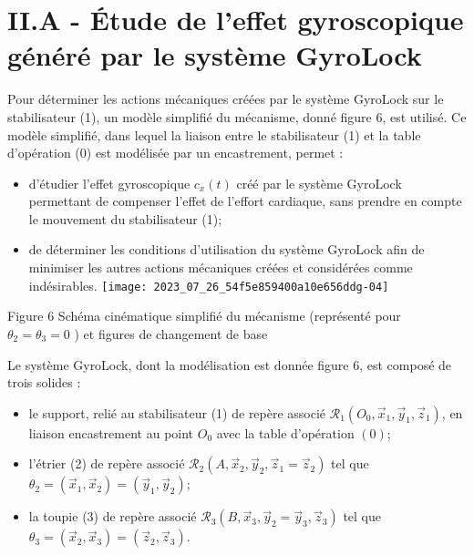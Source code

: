 \section{II.A - Étude de l'effet gyroscopique généré par le système GyroLock}
Pour déterminer les actions mécaniques créées par le système GyroLock sur le stabilisateur (1), un modèle simplifié du mécanisme, donné figure 6, est utilisé. Ce modèle simplifié, dans lequel la liaison entre le stabilisateur (1) et la table d'opération (0) est modélisée par un encastrement, permet :

\begin{itemize}
  \item d'étudier l'effet gyroscopique $c_{x}(t)$ créé par le système GyroLock permettant de compenser l'effet de l'effort cardiaque, sans prendre en compte le mouvement du stabilisateur (1);

  \item de déterminer les conditions d'utilisation du système GyroLock afin de minimiser les autres actions mécaniques créées et considérées comme indésirables.
\texttt{[image: 2023\_07\_26\_54f5e859400a10e656ddg-04]}

\end{itemize}

Figure 6 Schéma cinématique simplifié du mécanisme (représenté pour $\theta_{2}=\theta_{3}=0$ ) et figures de changement de base

Le système GyroLock, dont la modélisation est donnée figure 6, est composé de trois solides :

\begin{itemize}
  \item le support, relié au stabilisateur (1) de repère associé $\mathcal{R}_{1}\left(O_{0}, \vec{x}_{1}, \vec{y}_{1}, \vec{z}_{1}\right)$, en liaison encastrement au point $O_{0}$ avec la table d'opération $(0)$;

  \item l'étrier (2) de repère associé $\mathcal{R}_{2}\left(A, \vec{x}_{2}, \vec{y}_{2}, \vec{z}_{1}=\vec{z}_{2}\right)$ tel que $\theta_{2}=\left(\vec{x}_{1}, \vec{x}_{2}\right)=\left(\vec{y}_{1}, \vec{y}_{2}\right)$;

  \item la toupie (3) de repère associé $\mathcal{R}_{3}\left(B, \vec{x}_{3}, \vec{y}_{2}=\vec{y}_{3}, \vec{z}_{3}\right)$ tel que $\theta_{3}=\left(\vec{x}_{2}, \vec{x}_{3}\right)=\left(\vec{z}_{2}, \vec{z}_{3}\right)$.

\end{itemize}


